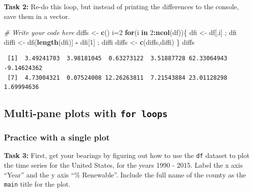 \documentclass[
]{book}
\newenvironment{Shaded}{\begin{snugshade}}{\end{snugshade}}
\newcommand{\CommentTok}[1]{\textcolor[rgb]{0.56,0.35,0.01}{\textit{#1}}}
\newcommand{\ControlFlowTok}[1]{\textcolor[rgb]{0.13,0.29,0.53}{\textbf{#1}}}
\newcommand{\DecValTok}[1]{\textcolor[rgb]{0.00,0.00,0.81}{#1}}
\newcommand{\KeywordTok}[1]{\textcolor[rgb]{0.13,0.29,0.53}{\textbf{#1}}}
\newcommand{\NormalTok}[1]{#1}
\newcommand{\OperatorTok}[1]{\textcolor[rgb]{0.81,0.36,0.00}{\textbf{#1}}}
\newcommand{\StringTok}[1]{\textcolor[rgb]{0.31,0.60,0.02}{#1}}
\begin{document}
\textbf{Task 2:} Re-do this loop, but instead of printing the differences to the console, save them in a vector.

\begin{Shaded}
\begin{Highlighting}[]
\CommentTok{# Write your code here}
\NormalTok{diffs <-}\StringTok{ }\KeywordTok{c}\NormalTok{()}
\NormalTok{i=}\DecValTok{2}
\ControlFlowTok{for}\NormalTok{(i }\ControlFlowTok{in} \DecValTok{2}\OperatorTok{:}\KeywordTok{ncol}\NormalTok{(df))\{}
\NormalTok{  dfi <-}\StringTok{ }\NormalTok{df[,i] ; dfi}
\NormalTok{  diffi <-}\StringTok{ }\NormalTok{dfi[}\KeywordTok{length}\NormalTok{(dfi)] }\OperatorTok{-}\StringTok{ }\NormalTok{dfi[}\DecValTok{1}\NormalTok{] ; diffi}
\NormalTok{  diffs <-}\StringTok{ }\KeywordTok{c}\NormalTok{(diffs,diffi)}
\NormalTok{\}}
\NormalTok{diffs}
\end{Highlighting}
\end{Shaded}

\begin{verbatim}
 [1]  3.49241703  3.98181045  0.63273122  3.51887728 62.33064943 -9.14624362
 [7]  4.73004321  0.07524008 12.26263811  7.21543884 23.01128298  1.69994636
\end{verbatim}

\hypertarget{multi-pane-plots-with-for-loops}{%
\subsection*{\texorpdfstring{Multi-pane plots with \texttt{for\ loops}}{Multi-pane plots with for loops}}\label{multi-pane-plots-with-for-loops}}

\hypertarget{practice-with-a-single-plot}{%
\subsubsection*{Practice with a single plot}\label{practice-with-a-single-plot}}

\textbf{Task 3:} First, get your bearings by figuring out how to use the \texttt{df} dataset to plot the time series for the United States, for the years 1990 - 2015. Label the x axis ``Year'' and the y axis ``\% Renewable''. Include the full name of the county as the \texttt{main} title for the plot.
\end{document}
